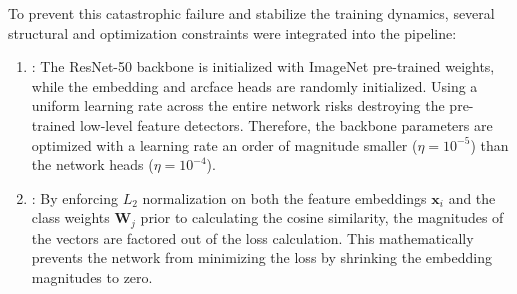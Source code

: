To prevent this catastrophic failure and stabilize the training dynamics, several structural and optimization constraints were integrated into the pipeline:
\begin{enumerate}
    \item {}: The \ac{ResNet}-50 backbone is initialized with ImageNet pre-trained weights, while the embedding and \ac{arcface} heads are randomly initialized. Using a uniform learning rate across the entire network risks destroying the pre-trained low-level feature detectors. Therefore, the backbone parameters are optimized with a learning rate an order of magnitude smaller ($\eta = 10^{-5}$) than the network heads ($\eta = 10^{-4}$).
    \item {}: By enforcing $L_2$ normalization on both the feature embeddings $\mathbf{x}_i$ and the class weights $\mathbf{W}_j$ prior to calculating the cosine similarity, the magnitudes of the vectors are factored out of the loss calculation. This mathematically prevents the network from minimizing the loss by shrinking the embedding magnitudes to zero.
\end{enumerate}
